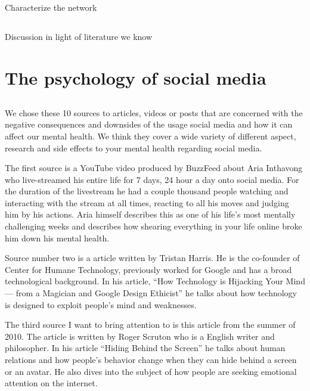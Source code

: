 \documentclass[11pt]{article}
\begin{document}
\subsection{}
Characterize the network

\subsection{}
Discussion in light of literature we know

\section{The psychology of social media}

\subsection{}

We chose these 10 sources to articles, videos or posts that are concerned with the
negative consequences and downsides of the usage social media and how it can affect
our mental health. We think they cover a wide variety of different aspect, research
and side effects to your mental health regarding social media.

The first source \cite{youtube1} is a YouTube video produced by BuzzFeed about Aria
Inthavong who live-streamed his entire life for 7 days, 24 hour a day onto social media.
For the duration of the livestream he had a couple thousand people watching and interacting
with the stream at all times, reacting to all his moves and judging him by his actions.
Aria himself describes this as one of his life's most mentally challenging weeks and
describes how shearing everything in your life online broke him down his mental health.

Source number two \cite{medium} is a article written by Tristan Harris. He is the
co-founder of Center for Humane Technology, previously worked for Google and has a
broad technological background. In his article, “How Technology is Hijacking Your Mind
— from a Magician and Google Design Ethicist” he talks about how technology is designed
to exploit people's mind and weaknesses.

The third source \cite{thenewatlantis} I want to bring attention to is this article
from the summer of 2010. The article is written by Roger Scruton who is a English
writer and philosopher. In his article “Hiding Behind the Screen” he talks about
human relations and how people's behavior change when they can hide behind a screen
or an avatar. He also dives into the subject of how people are seeking emotional
attention on the internet.
\end{document}

